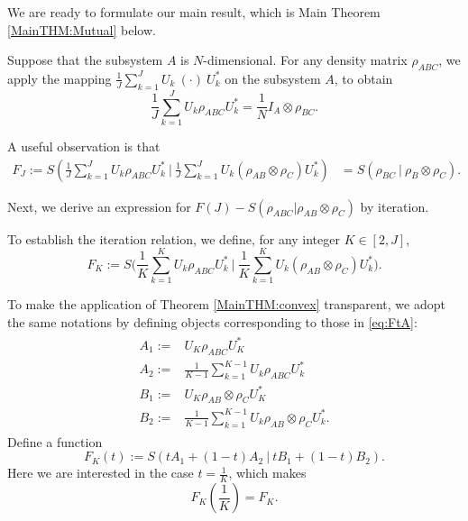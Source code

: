 \documentclass{article}
\numberwithin{equation}{section}
\begin{document}
We are ready to formulate our main result, which is Main Theorem \ref{MainTHM:Mutual} below.

Suppose that the subsystem $A$ is $N$-dimensional. For any density matrix $\rho_{ABC}$, we apply the mapping $\frac{1}{J} \sum_{k=1}^{J} U_k\ (\cdot)\ U_k^*$ on the subsystem $A$, to obtain
\begin{equation}
    \frac{1}{J} \sum_{k=1}^{J} U_k \rho_{ABC} U_k^* = \frac{1}{N} I_A \otimes \rho_{BC}.
\end{equation}

A useful observation is that
\begin{align}\label{eq:identityFJ}
    F_J:=S\left( \frac{1}{J} \sum_{k=1}^{J} U_k \rho_{ABC} U_k^* \ \bigg|\ \frac{1}{J} \sum_{k=1}^{J} U_k (\rho_{AB}\otimes \rho_{C}) U_k^* \right) &=  S\left( \rho_{BC} \ \bigg|\  \rho_B \otimes \rho_{C} \right) .
\end{align}

Next, we derive an expression for $F(J)-S(\rho_{ABC} \big| \rho_{AB}\otimes \rho_{C})$ by iteration.

To establish the iteration relation, we define, for any integer $K\in [2, J]$,
\begin{equation}\label{def:FK}
  F_K:=S\Big( \frac{1}{K} \sum_{k=1}^{K} U_k \rho_{ABC} U_k^* \ \Big|\ \frac{1}{K} \sum_{k=1}^{K} U_k (\rho_{AB} \otimes \rho_{C}) U_k^* \Big).
\end{equation}

To make the application of Theorem \ref{MainTHM:convex} transparent, we adopt the same notations by defining objects corresponding to those in \eqref{eq:FtA}:
\begin{align}\label{eq:choices}
\begin{split}
  A_1:=&U_K \rho_{ABC} U_K^*\\
  A_2:=&\frac{1}{K-1} \sum_{k=1}^{K-1} U_k \rho_{ABC} U_k^*\\
  B_1:=&U_K \rho_{AB}\otimes \rho_{C} U_K^*\\
  B_2:=&\frac{1}{K-1} \sum_{k=1}^{K-1} U_k \rho_{AB}\otimes \rho_C U_k^*.
\end{split}
\end{align}
Define a function
\begin{equation}
    F_K(t) := S\left( t A_1 + (1-t) A_2 \ \big|\ t B_1 + (1-t) B_2 \right).
\end{equation} 
Here we are interested in the case $t=\frac{1}{K}$, which makes
\begin{equation}
  F_{K}(\frac{1}{K})=F_{K}.
\end{equation}
\end{document}
